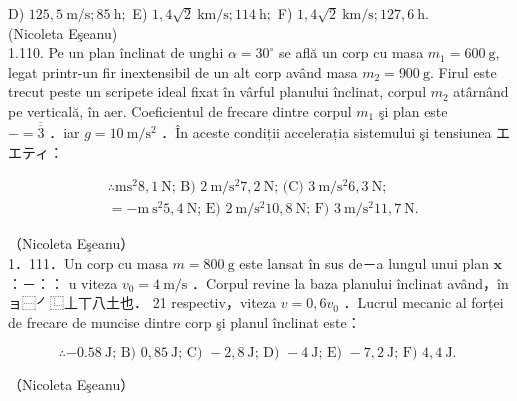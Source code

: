 \documentclass[10pt]{article}
\begin{document}
D) $125,5 \mathrm{~m} / \mathrm{s} ; 85 \mathrm{~h} ;$ E) $1,4 \sqrt{2} \mathrm{~km} / \mathrm{s} ; 114 \mathrm{~h} ;$ F) $1,4 \sqrt{2} \mathrm{~km} / \mathrm{s} ; 127,6 \mathrm{~h}$.\\
(Nicoleta Eşeanu)\\
1.110. Pe un plan înclinat de unghi $\alpha=30^{\circ}$ se află un corp cu masa $m_{1}=600 \mathrm{~g}$, legat printr-un fir inextensibil de un alt corp având masa $m_{2}=900 \mathrm{~g}$. Firul este trecut peste un scripete ideal fixat în vârful planului înclinat, corpul $m_{2}$ atârnând pe verticală, în aer. Coeficientul de frecare dintre corpul $m_{1}$ şi plan este\\
$-=\overline{\overline{3}}$ ．iar $g=10 \mathrm{~m} / \mathrm{s}^{2}$ ．În aceste condiții accelerația sistemului şi tensiunea エエティ：

$$
\begin{aligned}
& \therefore \mathrm{ms}^{2} 8,1 \mathrm{~N} \text {; B) } 2 \mathrm{~m} / \mathrm{s}^{2} 7,2 \mathrm{~N} \text {; (C) } 3 \mathrm{~m} / \mathrm{s}^{2} 6,3 \mathrm{~N} \text {; } \\
& =-\mathrm{m} \mathrm{~s}^{2} 5,4 \mathrm{~N} \text {; E) } 2 \mathrm{~m} / \mathrm{s}^{2} 10,8 \mathrm{~N} \text {; F) } 3 \mathrm{~m} / \mathrm{s}^{2} 11,7 \mathrm{~N} \text {. }
\end{aligned}
$$

（Nicoleta Eşeanu）\\
1．111．Un corp cu masa $m=800 \mathrm{~g}$ este lansat în sus de－a lungul unui plan $\mathbf{x}$ ：－：： u viteza $v_{0}=4 \mathrm{~m} / \mathrm{s}$ ．Corpul revine la baza planului înclinat având，în ョ⿱㇒⿺丄丅八土也． 21 respectiv，viteza $v=0,6 v_{0}$ ．Lucrul mecanic al forței de frecare de muncise dintre corp şi planul înclinat este：

$$
\therefore-0.58 \mathrm{~J} \text {; B) } 0,85 \mathrm{~J} \text {; C) }-2,8 \mathrm{~J} \text {; D) }-4 \mathrm{~J} \text {; E) }-7,2 \mathrm{~J} \text {; F) } 4,4 \mathrm{~J} \text {. }
$$

（Nicoleta Eşeanu）
\end{document}
